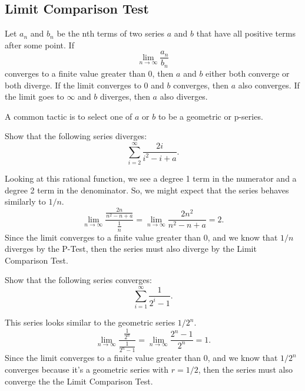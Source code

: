 \subsection{Limit Comparison Test}
\begin{lemma}
	Let $a_n$ and $b_n$ be the nth terms of two series $a$ and $b$ that have all positive terms after some point.
	If
	\begin{equation*}
		\lim_{n\to\infty}{\frac{a_n}{b_n}}
	\end{equation*}
	converges to a finite value greater than 0, then $a$ and $b$ either both converge or both diverge.
	If the limit converges to 0 and $b$ converges, then $a$ also converges.
	If the limit goes to $\infty$ and $b$ diverges, then $a$ also diverges.
\end{lemma}
\noindent
A common tactic is to select one of $a$ or $b$ to be a geometric or p-series.

\begin{example}
	Show that the following series diverges:
	\begin{equation*}
		\sum_{i=2}^{\infty}{\frac{2i}{i^2-i+a}}.
	\end{equation*}
\end{example}
Looking at this rational function, we see a degree 1 term in the numerator and a degree 2 term in the denominator.
So, we might expect that the series behaves similarly to $1/n$.
\begin{equation*}
	\lim_{n\to\infty}{\frac{\frac{2n}{n^2-n+a}}{\frac{1}{n}}} = \lim_{n\to\infty}{\frac{2n^2}{n^2-n+a}} = 2.
\end{equation*}
\indent
Since the limit converges to a finite value greater than 0, and we know that $1/n$ diverges by the P-Test, then the series must also diverge by the Limit Comparison Test.

\begin{example}
	Show that the following series converges:
	\begin{equation*}
		\sum_{i=1}^{\infty}{\frac{1}{2^i - 1}}.
	\end{equation*}
\end{example}
This series looks similar to the geometric series $1/2^n$.
\begin{equation*}
	\lim_{n\to\infty}{\frac{\frac{1}{2^n}}{\frac{1}{2^n-1}}} = \lim_{n\to\infty}{\frac{2^n - 1}{2^n}} = 1.
\end{equation*}
\indent
Since the limit converges to a finite value greater than 0, and we know that $1/2^n$ converges because it's a geometric series with $r=1/2$, then the series must also converge the the Limit Comparison Test.

